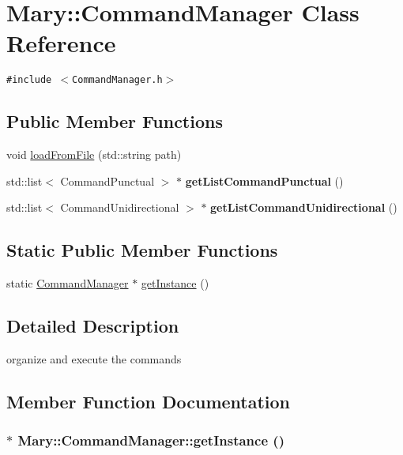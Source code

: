 \hypertarget{class_mary_1_1_command_manager}{
\section{Mary::CommandManager Class Reference}
\label{class_mary_1_1_command_manager}
}
{\tt \#include $<$CommandManager.h$>$}

\subsection*{Public Member Functions}
\begin{CompactItemize}
\item 
void \hyperlink{class_mary_1_1_command_manager_4cf3ce59ba3b7be4b65c1e62b610300e}{loadFromFile} (std::string path)
\item 
\hypertarget{class_mary_1_1_command_manager_5ee08d0d50c720839dadb89571fd73ea}{
std::list$<$ CommandPunctual $>$ $\ast$ \textbf{getListCommandPunctual} ()}
\label{class_mary_1_1_command_manager_5ee08d0d50c720839dadb89571fd73ea}

\item 
\hypertarget{class_mary_1_1_command_manager_ee3cf6c97ce60992f71d902ff50d5135}{
std::list$<$ CommandUnidirectional $>$ $\ast$ \textbf{getListCommandUnidirectional} ()}
\label{class_mary_1_1_command_manager_ee3cf6c97ce60992f71d902ff50d5135}

\end{CompactItemize}
\subsection*{Static Public Member Functions}
\begin{CompactItemize}
\item 
static \hyperlink{class_mary_1_1_command_manager}{CommandManager} $\ast$ \hyperlink{class_mary_1_1_command_manager_5f57a3f1f7498072e52ea0367c3d652c}{getInstance} ()
\end{CompactItemize}


\subsection{Detailed Description}
organize and execute the commands 

\subsection{Member Function Documentation}
\hypertarget{class_mary_1_1_command_manager_5f57a3f1f7498072e52ea0367c3d652c}{
\subsubsection[getInstance]{ $\ast$ Mary::CommandManager::getInstance ()}}
\label{class_mary_1_1_command_manager_5f57a3f1f7498072e52ea0367c3d652c}


